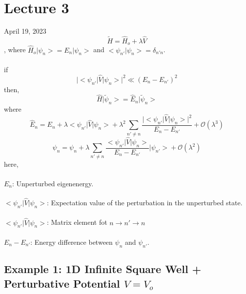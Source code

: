 \documentclass[12pt,fancychapters]{report}
\numberwithin{equation}{section}
\begin{document}
\section{Lecture 3}
April 19, 2023
\begin{equation*}
	\tilde{H} = \hat{H}_o + \lambda \hat{V}
\end{equation*}
, where $\hat{H}_o\big|\psi_n\big> = E_n\big|\psi_n\big>$ and $\big<\psi_{n'}\big|\psi_{n}\big> = \delta_{n'n}$.\\
\\
if
\[ \big|\big<\psi_{n'}\big|\hat{V}\big|\psi_n\big>\big|^2 \ll (E_n - E_{n'})^2\]
then, 
\begin{equation*}
	\hat{H}\big|\tilde{\psi}_n\big> = \hat{E}_n \big|\tilde{\psi}_n \big>
\end{equation*}
where 
\begin{equation*}
	\hat{E}_n = E_n + \lambda \big<\psi_{n'}\big|\hat{V}\big|\psi_n\big> + \lambda^2 \sum_{n'\neq n}
	\frac{\big|\big<\psi_{n'}\big|\hat{V}\big|\psi_n\big>\big|^2}{E_n - E_{n'}} + \mathcal{O}(\lambda^3)
\end{equation*}
\begin{equation*}
	\psi_n = \psi_n + \lambda \sum_{n'\neq n} \frac{\big<\psi_{n'}\big|\hat{V}\big|\psi_n\big>}
	{E_n - E_{n'}}\big|\psi_{n'}\big> + \mathcal{O}(\lambda^2)
\end{equation*}
here,\\
\\
$E_n$: Unperturbed eigenenergy.\\
\\
$ \big<\psi_{n'}\big|\hat{V}\big|\psi_n\big>$: Expectation value of the perturbation in the
unperturbed state.\\
\\
$\big<\psi_{n'}\big|\hat{V}\big|\psi_n\big> $: Matrix element fot $n\rightarrow n' \rightarrow n$\\
\\
$E_n - E_{n'}$: Energy difference between $\psi_n$ and $\psi_{n'}$. 
\subsection{Example 1: 1D Infinite Square Well + Perturbative Potential $V=V_o$}
\end{document}
